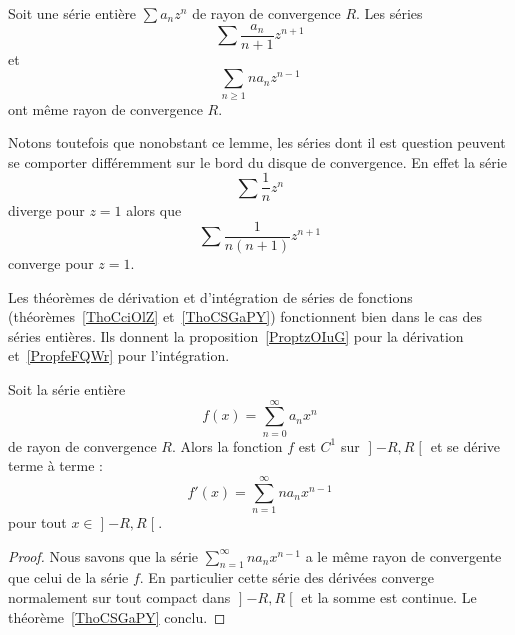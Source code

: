 \begin{lemma}       \label{LemFVMaSD}
    Soit une série entière \( \sum a_nz^n\) de rayon de convergence \( R\). Les séries
    \begin{equation}
        \sum \frac{ a_n }{ n+1 }z^{n+1}
    \end{equation}
    et
    \begin{equation}
        \sum_{n\geq 1}na_nz^{n-1}
    \end{equation}
    ont même rayon de convergence \( R\).
\end{lemma}

Notons toutefois que nonobstant ce lemme, les séries dont il est question peuvent se comporter différemment sur le bord du disque de convergence. En effet la série
\begin{equation}
    \sum \frac{1}{ n }z^n
\end{equation}
diverge pour \( z=1\) alors que
\begin{equation}
    \sum\frac{1}{ n(n+1) }z^{n+1}
\end{equation}
converge pour \( z=1\).


Les théorèmes de dérivation et d'intégration de séries de fonctions (théorèmes~\ref{ThoCciOlZ} et~\ref{ThoCSGaPY}) fonctionnent bien dans le cas des séries entières. Ils donnent la proposition~\ref{ProptzOIuG} pour la dérivation et~\ref{PropfeFQWr} pour l'intégration.

\begin{proposition}     \label{ProptzOIuG}
    Soit la série entière
    \begin{equation}
        f(x)=\sum_{n=0}^{\infty}a_n x^n
    \end{equation}
    de rayon de convergence \( R\). Alors la fonction \( f\) est \( C^1\) sur \( \mathopen] -R , R \mathclose[\) et se dérive terme à terme :
    \begin{equation}
        f'(x)=\sum_{n=1}^{\infty}na_nx^{n-1}
    \end{equation}
    pour tout \( x\in\mathopen] -R , R \mathclose[\).
\end{proposition}

\begin{proof}
    Nous savons que la série \( \sum_{n=1}^{\infty}na_nx^{n-1}\) a le même rayon de convergente que celui de la série \( f\). En particulier cette série des dérivées converge normalement sur tout compact dans \( \mathopen] -R , R \mathclose[\) et la somme est continue. Le théorème~\ref{ThoCSGaPY} conclu.
\end{proof}

